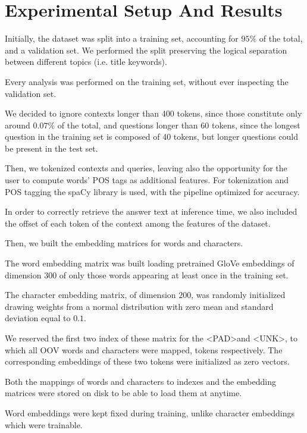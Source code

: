 \chapter{Experimental Setup And Results}
    Initially, the dataset was split into a training set, accounting for $95\%$ of the total, and a validation set.
    We performed the split preserving the logical separation between different topics (i.e. title keywords).

    Every analysis was performed on the training set, without ever inspecting the validation set.

    We decided to ignore contexts longer than 400 tokens, since those constitute only around $0.07\%$ of the total, and questions longer than 60 tokens, since 
    the longest question in the training set is composed of 40 tokens, but longer questions could be present in the test set.
    
    Then, we tokenized contexts and queries, leaving also the opportunity for the user to compute words' POS tags as additional features.
    For tokenization and POS tagging the spaCy library is used, with the pipeline optimized for accuracy. 
    
    In order to correctly retrieve the answer text at inference time, we also included the offset of each token of the context among the features of the dataset.

    Then, we built the embedding matrices for words and characters.

    The word embedding matrix was built loading pretrained GloVe\cite{pennington-etal-2014-glove} embeddings of dimension $300$ of only those words appearing at least once in the training set.
    
    The character embedding matrix, of dimension $200$, was randomly initialized drawing weights from a normal distribution with zero mean and standard deviation equal to $0.1$.

    We reserved the first two index of these matrix for the \textless PAD\textgreater  and \textless UNK\textgreater, to which all OOV words and characters were mapped, tokens respectively.
    The corresponding embeddings of these two tokens were initialized as zero vectors.

    Both the mappings of words and characters to indexes and the embedding matrices were stored on disk to be able to load them at anytime.

    Word embeddings were kept fixed during training, unlike character embeddings which were trainable.

